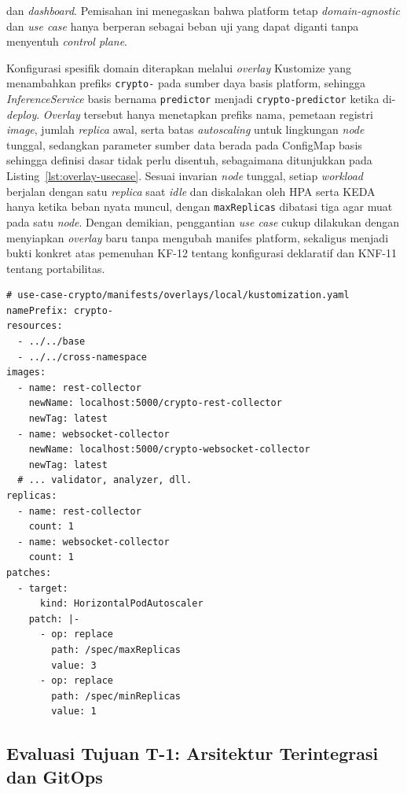 dan \textit{dashboard}. Pemisahan ini menegaskan bahwa platform tetap \textit{domain-agnostic} dan \textit{use case} hanya berperan sebagai beban uji yang dapat diganti tanpa menyentuh \textit{control plane}.

Konfigurasi spesifik domain diterapkan melalui \textit{overlay} Kustomize yang menambahkan prefiks \texttt{crypto-} pada sumber daya basis platform, sehingga \textit{InferenceService} basis bernama \texttt{predictor} menjadi \texttt{crypto-predictor} ketika di-\textit{deploy}. \textit{Overlay} tersebut hanya menetapkan prefiks nama, pemetaan registri \textit{image}, jumlah \textit{replica} awal, serta batas \textit{autoscaling} untuk lingkungan \textit{node} tunggal, sedangkan parameter sumber data berada pada ConfigMap basis sehingga definisi dasar tidak perlu disentuh, sebagaimana ditunjukkan pada Listing~\ref{lst:overlay-usecase}. Sesuai invarian \textit{node} tunggal, setiap \textit{workload} berjalan dengan satu \textit{replica} saat \textit{idle} dan diskalakan oleh HPA serta KEDA hanya ketika beban nyata muncul, dengan \texttt{maxReplicas} dibatasi tiga agar muat pada satu \textit{node}. Dengan demikian, penggantian \textit{use case} cukup dilakukan dengan menyiapkan \textit{overlay} baru tanpa mengubah manifes platform, sekaligus menjadi bukti konkret atas pemenuhan KF-12 tentang konfigurasi deklaratif dan KNF-11 tentang portabilitas.

\begin{lstlisting}[caption={Kutipan \textit{overlay} Kustomize \textit{use case}},label={lst:overlay-usecase},basicstyle=\ttfamily\footnotesize,keywordstyle=\ttfamily,breaklines=true,captionpos=t]
# use-case-crypto/manifests/overlays/local/kustomization.yaml
namePrefix: crypto-
resources:
  - ../../base
  - ../../cross-namespace
images:
  - name: rest-collector
    newName: localhost:5000/crypto-rest-collector
    newTag: latest
  - name: websocket-collector
    newName: localhost:5000/crypto-websocket-collector
    newTag: latest
  # ... validator, analyzer, dll.
replicas:
  - name: rest-collector
    count: 1
  - name: websocket-collector
    count: 1
patches:
  - target:
      kind: HorizontalPodAutoscaler
    patch: |-
      - op: replace
        path: /spec/maxReplicas
        value: 3
      - op: replace
        path: /spec/minReplicas
        value: 1
\end{lstlisting}

\subsection{Evaluasi Tujuan T-1: Arsitektur Terintegrasi dan GitOps}
\label{subsec:metode-t1}

